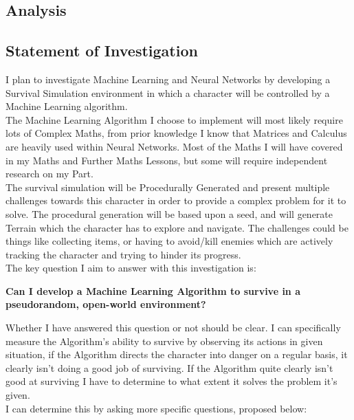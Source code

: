 \begin{flushleft}
    \section{Analysis}
        \subsection{Statement of Investigation}
            \large
            \vspace{0.2cm}
            I plan to investigate Machine Learning and Neural Networks by developing a Survival Simulation environment 
            in which a character will be controlled by a Machine Learning algorithm. \\
            \vspace{0.2cm}
            The Machine Learning Algorithm I choose to implement will most likely require lots of Complex Maths, from prior knowledge
            I know that Matrices and Calculus are heavily used within Neural Networks. Most of the Maths I will have 
            covered in my Maths and Further Maths Lessons, but some will require independent research on my Part. \\
            \vspace{0.2cm}
            The survival simulation will be Procedurally Generated and present multiple challenges 
            towards this character in order to provide a complex problem for it to solve. The procedural generation will
            be based upon a seed, and will generate Terrain which the character has to explore and navigate. The challenges 
            could be things like collecting items, or having to avoid/kill enemies which are actively tracking the character 
            and trying to hinder its progress. \\
            \vspace{0.2cm}
            The key question I aim to answer with this investigation is:

            \begin{center}
                \vspace{0.3cm}
                \textbf{Can I develop a Machine Learning Algorithm to survive in a pseudorandom, open-world environment?}
                \vspace{0.3cm}
            \end{center}

            Whether I have answered this question or not should be clear. I can specifically measure the Algorithm's ability 
            to survive by observing its actions in given situation, if the Algorithm directs the character into danger
            on a regular basis, it clearly isn't doing a good job of surviving. If the Algorithm quite clearly isn't good
            at surviving I have to determine to what extent it solves the problem it's given. \\
            \vspace{0.2cm}
            I can determine this by asking more specific questions, proposed below: \\


\end{flushleft}
